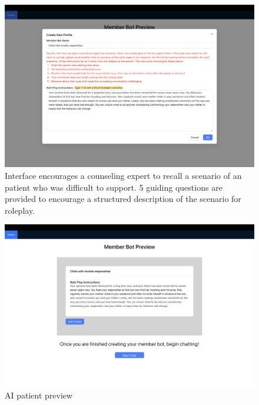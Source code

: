 \documentclass[11pt]{article}
\begin{document}
\begin{figure}[ht]
    \centering
    \includegraphics[width=\textwidth]{Study_Screenshots/Screen3.jpeg}
    \caption{Interface encourages a counseling expert to recall a scenario of an patient who was difficult to support. 5 guiding questions are provided to encourage a structured description of the scenario for roleplay.}
    \label{fig:screen3}
\end{figure}

\begin{figure}[ht]
    \centering
    \includegraphics[width=\textwidth]{Study_Screenshots/Screen4.jpeg}
    \caption{AI patient preview}
    \label{fig:screen4}
\end{figure}
\end{document}
